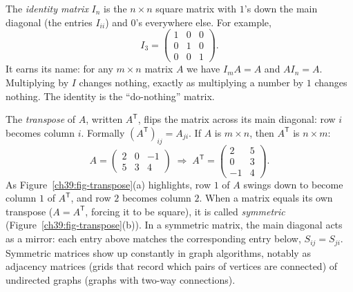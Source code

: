 The \emph{identity matrix} $I_n$ is the $n \times n$ square matrix with $1$'s down
the main diagonal (the entries $I_{ii}$) and $0$'s everywhere else. For example,
\[
I_3 = \begin{pmatrix} 1 & 0 & 0 \\ 0 & 1 & 0 \\ 0 & 0 & 1 \end{pmatrix}.
\]
It earns its name: for any $m \times n$ matrix $A$ we have $I_m A = A$ and
$A I_n = A$. Multiplying by $I$ changes nothing, exactly as multiplying a number
by $1$ changes nothing. The identity is the ``do-nothing'' matrix.

The \emph{transpose} of $A$, written $A^{\mathsf T}$, flips the matrix across its
main diagonal: row $i$ becomes column $i$. Formally $(A^{\mathsf T})_{ij} =
A_{ji}$. If $A$ is $m \times n$, then $A^{\mathsf T}$ is $n \times m$:
\[
A = \begin{pmatrix} 2 & 0 & -1 \\ 5 & 3 & 4 \end{pmatrix}
\;\Longrightarrow\;
A^{\mathsf T} = \begin{pmatrix} 2 & 5 \\ 0 & 3 \\ -1 & 4 \end{pmatrix}.
\]
As Figure~\ref{ch39:fig-transpose}(a) highlights, row $1$ of $A$ swings down to
become column $1$ of $A^{\mathsf T}$, and row $2$ becomes column $2$. When a
matrix equals its own transpose ($A = A^{\mathsf T}$, forcing it to be square),
it is called \emph{symmetric} (Figure~\ref{ch39:fig-transpose}(b)). In a symmetric
matrix, the main diagonal acts as a mirror: each entry above matches the corresponding
entry below, $S_{ij} = S_{ji}$. Symmetric matrices show up constantly in graph
algorithms, notably as adjacency matrices (grids that record which pairs of vertices are connected) of undirected graphs (graphs with two-way connections).

